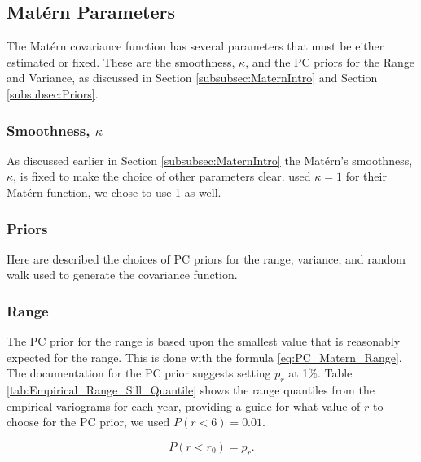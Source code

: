 \subsection{Mat\'{e}rn Parameters}
\label{subsec:maternparas}
The Mat\'{e}rn covariance function has several parameters that must be either estimated or fixed. These are the smoothness, $\kappa$, and the PC priors for the Range and Variance, as discussed in Section \ref{subsubsec:MaternIntro} and Section \ref{subsubsec:Priors}.

\subsubsection*{Smoothness, $\kappa$}
\label{subsubsec:smoothness}
As discussed earlier in Section \ref{subsubsec:MaternIntro} the Mat\'{e}rn's smoothness, $\kappa$, is fixed to make the choice of other parameters clear.  \cite{cameletti2011spatio} used $\kappa = 1$ for their Mat\'{e}rn function, we chose to use 1 as well.

\subsubsection*{Priors}
\label{subsubsec:priors}
Here are described the choices of \ac{PC} priors for the range, variance, and random walk used to generate the covariance function.

\subsubsection{Range}
\label{subsubsec:range}
The PC prior for the range is based upon the smallest value that is reasonably expected for the range.  This is done with the formula \ref{eq:PC_Matern_Range}.  The documentation for the PC prior suggests setting $p_r$ at 1\%. Table \ref{tab:Empirical_Range_Sill_Quantile} shows the range quantiles from the empirical variograms for each year, providing a guide for what value of $r$ to choose for the PC prior, we used $P(r < 6) = 0.01$.  

\begin{equation} \label{eq:PC_Matern_Range}
	P(r < r_0) = p_{r}.    
\end{equation} 

